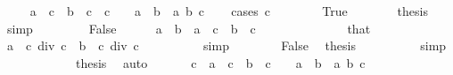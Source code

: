 \begin{isabellebody}
%
\isadelimproof
%
\endisadelimproof
%
\isatagproof
{}\isamarkupfalse%
\isanewline
\ \ \isamarkupfalse%
\ {\isacharasterisk}{\kern0pt}{\isacharcolon}{\kern0pt}\ {\isachardoublequoteopen}a\ {\isacharasterisk}{\kern0pt}\ c\ {\isacharequal}{\kern0pt}\ b\ {\isacharasterisk}{\kern0pt}\ c\ {\isasymlongleftrightarrow}\ c\ {\isacharequal}{\kern0pt}\ {}\ {\isasymor}\ a\ {\isacharequal}{\kern0pt}\ b{\isachardoublequoteclose}\ \ a\ b\ c\isanewline
\ \ \isamarkupfalse%
\ {\isacharparenleft}{\kern0pt}cases\ {\isachardoublequoteopen}c\ {\isacharequal}{\kern0pt}\ {}{\isachardoublequoteclose}{\isacharparenright}{\kern0pt}\isanewline
\ \ \ \ \isamarkupfalse%
\ True\isanewline
\ \ \ \ \isamarkupfalse%
\ \isamarkupfalse%
\ {\isacharquery}{\kern0pt}thesis\ \isamarkupfalse%
\ simp\isanewline
\ \ \isamarkupfalse%
\isanewline
\ \ \ \ \isamarkupfalse%
\ False\isanewline
\ \ \ \ \isamarkupfalse%
\ {\isachardoublequoteopen}a\ {\isacharequal}{\kern0pt}\ b{\isachardoublequoteclose}\ \ {\isachardoublequoteopen}a\ {\isacharasterisk}{\kern0pt}\ c\ {\isacharequal}{\kern0pt}\ b\ {\isacharasterisk}{\kern0pt}\ c{\isachardoublequoteclose}\isanewline
\ \ \ \ \isamarkupfalse%
\ {\isacharminus}{\kern0pt}\isanewline
\ \ \ \ \ \ \isamarkupfalse%
\ that\ \isamarkupfalse%
\ {\isachardoublequoteopen}a\ {\isacharasterisk}{\kern0pt}\ c\ div\ c\ {\isacharequal}{\kern0pt}\ b\ {\isacharasterisk}{\kern0pt}\ c\ div\ c{\isachardoublequoteclose}\isanewline
\ \ \ \ \ \ \ \ \isamarkupfalse%
\ simp\isanewline
\ \ \ \ \ \ \isamarkupfalse%
\ False\ \isamarkupfalse%
\ {\isacharquery}{\kern0pt}thesis\isanewline
\ \ \ \ \ \ \ \ \isamarkupfalse%
\ simp\isanewline
\ \ \ \ \isamarkupfalse%
\isanewline
\ \ \ \ \isamarkupfalse%
\ \isamarkupfalse%
\ {\isacharquery}{\kern0pt}thesis\ \isamarkupfalse%
\ auto\isanewline
\ \ \isamarkupfalse%
\isanewline
\ \ \isamarkupfalse%
\ {\isachardoublequoteopen}c\ {\isacharasterisk}{\kern0pt}\ a\ {\isacharequal}{\kern0pt}\ c\ {\isacharasterisk}{\kern0pt}\ b\ {\isasymlongleftrightarrow}\ c\ {\isacharequal}{\kern0pt}\ {}\ {\isasymor}\ a\ {\isacharequal}{\kern0pt}\ b{\isachardoublequoteclose}\ \ a\ b\ c\isanewline
\ \ \ \ \isamarkupfalse%

\end{isabellebody}

